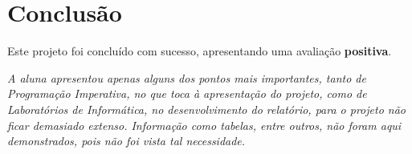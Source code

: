 \chapter{Conclusão}\label{chap:chap3}

Este projeto foi concluído com sucesso, apresentando uma avaliação \textbf{positiva}.

\textit{A aluna apresentou apenas alguns dos pontos mais importantes, tanto de Programação Imperativa, no que toca à apresentação do projeto, como de Laboratórios de Informática, no desenvolvimento do relatório, para o projeto não ficar demasiado extenso. Informação como tabelas, entre outros, não foram aqui demonstrados, pois não foi vista tal necessidade.} 